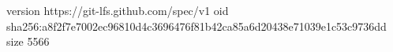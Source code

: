 version https://git-lfs.github.com/spec/v1
oid sha256:a8f2f7e7002ec96810d4c3696476f81b42ca85a6d20438e71039e1c53c9736dd
size 5566
